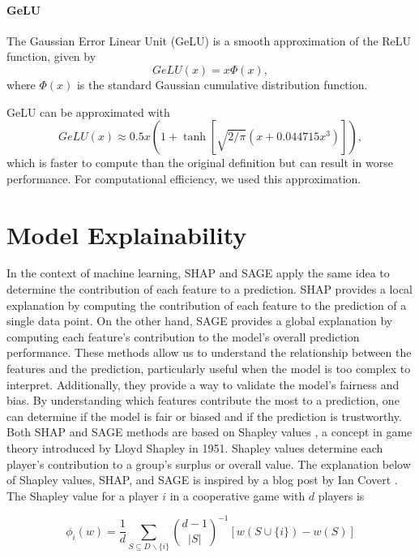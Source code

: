 \paragraph{GeLU}
The Gaussian Error Linear Unit (GeLU) is a smooth approximation of the ReLU function, given by
\begin{equation}
    GeLU(x) = x \Phi (x),
\end{equation}
where $\Phi(x)$ is the standard Gaussian cumulative distribution function.

GeLU can be approximated with
\begin{equation}
    GeLU(x) \approx 0.5x \left( 1+\tanh\left[\sqrt{2/\pi}(x+0.044715x^3)\right] \right),
\end{equation}
which is faster to compute than the original definition but can result in worse performance.
For computational efficiency, we used this approximation.


\section{Model Explainability}
In the context of machine learning, SHAP \cite{SHAP} and SAGE \cite{SAGE} apply the same idea to determine the contribution of each feature to a prediction.
SHAP provides a local explanation by computing the contribution of each feature to the prediction of a single data point.
On the other hand, SAGE provides a global explanation by computing each feature's contribution to the model's overall prediction performance.
These methods allow us to understand the relationship between the features and the prediction, particularly useful when the model is too complex to interpret.
Additionally, they provide a way to validate the model's fairness and bias.
By understanding which features contribute the most to a prediction, one can determine if the model is fair or biased and if the prediction is trustworthy.\\

Both SHAP and SAGE methods are based on Shapley values \cite{shapley_value_1953}, a concept in game theory introduced by Lloyd Shapley in 1951.
Shapley values determine each player's contribution to a group's surplus or overall value.
The explanation below of Shapley values, SHAP, and SAGE is inspired by a blog post by Ian Covert \cite{covert_shap_sage}.\\

The Shapley value for a player $i$ in a cooperative game with $d$ players is

\begin{equation}
    \phi_i(w) = \frac{1}{d} \sum_{S \subseteq D \backslash \{ i \} } \binom{d-1}{|S|}^{-1} \left[ w(S\cup \{ i \} ) - w(S) \right]
\end{equation}

